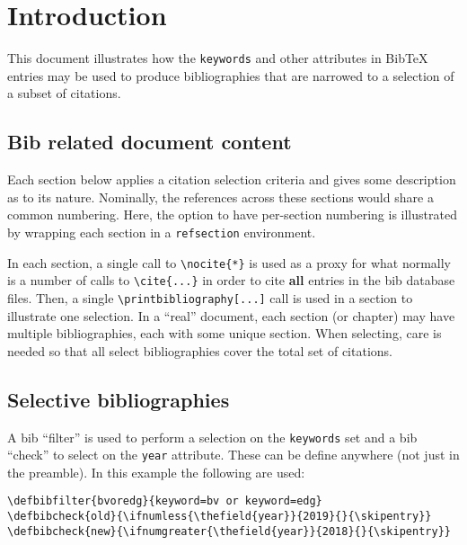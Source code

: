\documentclass{article}
\begin{document}
\section{Introduction}

This document illustrates how the \texttt{keywords} and other attributes in BibTeX entries may be used to produce bibliographies that are narrowed to a selection of a subset of citations.

\subsection{Bib related document content}

Each section below applies a citation selection criteria and gives some description as to its nature.  Nominally, the references across these sections would share a common numbering.  Here, the option to have per-section numbering is illustrated by wrapping each section in a \texttt{refsection} environment.  

In each section, a single call to \verb|\nocite{*}| is used as a proxy for what normally is a number of calls to \verb|\cite{...}| in order to cite \textbf{all} entries in the bib database files.  Then, a single \verb|\printbibliography[...]| call is used in a section to illustrate one selection.  In a ``real'' document, each section (or chapter) may have multiple bibliographies, each with some unique section.  When selecting, care is needed so that all select bibliographies cover the total set of citations.

\subsection{Selective bibliographies}

A bib ``filter'' is used to perform a selection on the \texttt{keywords} set and a bib ``check'' to select on the \texttt{year} attribute.  These can be define anywhere (not just in the preamble).  In this example the following are used:


\begin{verbatim}
\defbibfilter{bvoredg}{keyword=bv or keyword=edg}
\defbibcheck{old}{\ifnumless{\thefield{year}}{2019}{}{\skipentry}}
\defbibcheck{new}{\ifnumgreater{\thefield{year}}{2018}{}{\skipentry}}
\end{verbatim}
\end{document}
